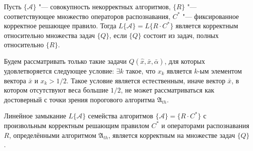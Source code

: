\begin{Corollary}
	Пусть $\{\mathcal{A}\}$ "--- совокупность некорректных алгоритмов, $\{R\}$ "--- соответствующее множество операторов распознавания, $C^*$ "--- фиксированное корректное решающее правило. Тогда $L\{\mathcal{A}\}=L\{R{\cdot}C^*\}$ является корректным относительно множества задач $\{Q\}$, если $\{Q\}$ состоит из задач, полных относительно $\{R\}$.
\end{Corollary}

Будем рассматривать только такие задачи $Q(\hat{x},\bar{x},\bar{\alpha})$, для которых удовлетворяется следующее условие: ${\exists}k$ такое, что $x_k$ является $k$-ым элементом вектора $\bar{x}$ и $x_k>1/2$. Такое условие является естественным, иначе вектор $\bar{x}$, в котором отсутствуют веса большие $1/2$, не может рассматриваться как достоверный с точки зрения порогового алгоритма $\mathfrak A_{th}$.
	
\begin{Theorem}
	\label{th:correctness}
	Линейное замыкание $L\{\mathcal{A}\}$ семейства алгоритмов $\{\mathcal{A}\}=\{R{\cdot}C^*\}$ с произвольным корректным решающим правилом $C^*$ и операторами распознавания $R$, определёнными алгоритмом $\mathfrak A_{th}$, является корректным на множестве задач $\{Q\}$.
\end{Theorem}

